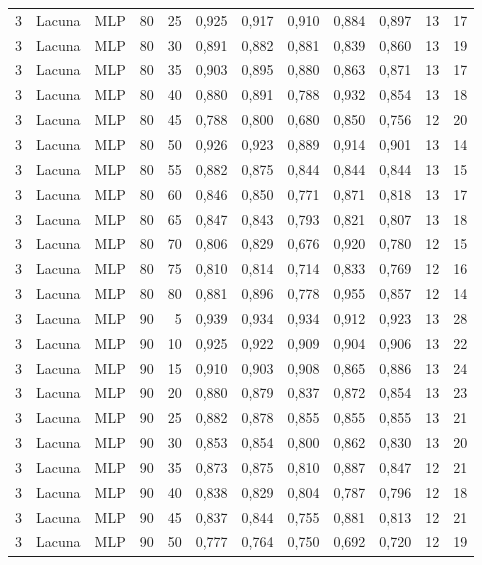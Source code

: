 \begin{longtable}{@{}rllrrrrrrrrr@{}}
3 & Lacuna & MLP & 80 & 25 & 0,925 & 0,917 & 0,910 & 0,884 & 0,897 & 13 & 17 \\
3 & Lacuna & MLP & 80 & 30 & 0,891 & 0,882 & 0,881 & 0,839 & 0,860 & 13 & 19 \\
3 & Lacuna & MLP & 80 & 35 & 0,903 & 0,895 & 0,880 & 0,863 & 0,871 & 13 & 17 \\
3 & Lacuna & MLP & 80 & 40 & 0,880 & 0,891 & 0,788 & 0,932 & 0,854 & 13 & 18 \\
3 & Lacuna & MLP & 80 & 45 & 0,788 & 0,800 & 0,680 & 0,850 & 0,756 & 12 & 20 \\
3 & Lacuna & MLP & 80 & 50 & 0,926 & 0,923 & 0,889 & 0,914 & 0,901 & 13 & 14 \\
3 & Lacuna & MLP & 80 & 55 & 0,882 & 0,875 & 0,844 & 0,844 & 0,844 & 13 & 15 \\
3 & Lacuna & MLP & 80 & 60 & 0,846 & 0,850 & 0,771 & 0,871 & 0,818 & 13 & 17 \\
3 & Lacuna & MLP & 80 & 65 & 0,847 & 0,843 & 0,793 & 0,821 & 0,807 & 13 & 18 \\
3 & Lacuna & MLP & 80 & 70 & 0,806 & 0,829 & 0,676 & 0,920 & 0,780 & 12 & 15 \\
3 & Lacuna & MLP & 80 & 75 & 0,810 & 0,814 & 0,714 & 0,833 & 0,769 & 12 & 16 \\
3 & Lacuna & MLP & 80 & 80 & 0,881 & 0,896 & 0,778 & 0,955 & 0,857 & 12 & 14 \\
3 & Lacuna & MLP & 90 & 5 & 0,939 & 0,934 & 0,934 & 0,912 & 0,923 & 13 & 28 \\
3 & Lacuna & MLP & 90 & 10 & 0,925 & 0,922 & 0,909 & 0,904 & 0,906 & 13 & 22 \\
3 & Lacuna & MLP & 90 & 15 & 0,910 & 0,903 & 0,908 & 0,865 & 0,886 & 13 & 24 \\
3 & Lacuna & MLP & 90 & 20 & 0,880 & 0,879 & 0,837 & 0,872 & 0,854 & 13 & 23 \\
3 & Lacuna & MLP & 90 & 25 & 0,882 & 0,878 & 0,855 & 0,855 & 0,855 & 13 & 21 \\
3 & Lacuna & MLP & 90 & 30 & 0,853 & 0,854 & 0,800 & 0,862 & 0,830 & 13 & 20 \\
3 & Lacuna & MLP & 90 & 35 & 0,873 & 0,875 & 0,810 & 0,887 & 0,847 & 12 & 21 \\
3 & Lacuna & MLP & 90 & 40 & 0,838 & 0,829 & 0,804 & 0,787 & 0,796 & 12 & 18 \\
3 & Lacuna & MLP & 90 & 45 & 0,837 & 0,844 & 0,755 & 0,881 & 0,813 & 12 & 21 \\
3 & Lacuna & MLP & 90 & 50 & 0,777 & 0,764 & 0,750 & 0,692 & 0,720 & 12 & 19 \\

\end{longtable}
